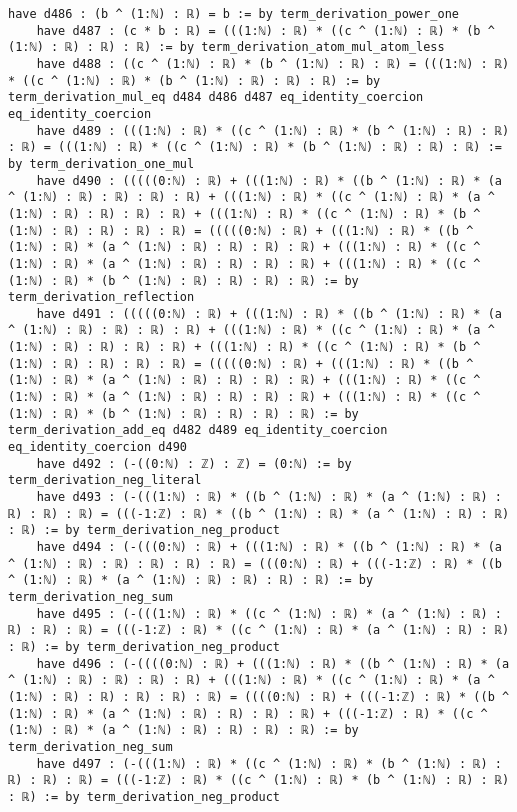\documentclass{article}
\begin{document}
\begin{tcolorbox}[colback=white!10, width=\linewidth]
\begin{lstlisting}[language=Lean4]
    have d486 : (b ^ (1:ℕ) : ℝ) = b := by term_derivation_power_one
    have d487 : (c * b : ℝ) = (((1:ℕ) : ℝ) * ((c ^ (1:ℕ) : ℝ) * (b ^ (1:ℕ) : ℝ) : ℝ) : ℝ) := by term_derivation_atom_mul_atom_less
    have d488 : ((c ^ (1:ℕ) : ℝ) * (b ^ (1:ℕ) : ℝ) : ℝ) = (((1:ℕ) : ℝ) * ((c ^ (1:ℕ) : ℝ) * (b ^ (1:ℕ) : ℝ) : ℝ) : ℝ) := by term_derivation_mul_eq d484 d486 d487 eq_identity_coercion eq_identity_coercion
    have d489 : (((1:ℕ) : ℝ) * ((c ^ (1:ℕ) : ℝ) * (b ^ (1:ℕ) : ℝ) : ℝ) : ℝ) = (((1:ℕ) : ℝ) * ((c ^ (1:ℕ) : ℝ) * (b ^ (1:ℕ) : ℝ) : ℝ) : ℝ) := by term_derivation_one_mul
    have d490 : (((((0:ℕ) : ℝ) + (((1:ℕ) : ℝ) * ((b ^ (1:ℕ) : ℝ) * (a ^ (1:ℕ) : ℝ) : ℝ) : ℝ) : ℝ) + (((1:ℕ) : ℝ) * ((c ^ (1:ℕ) : ℝ) * (a ^ (1:ℕ) : ℝ) : ℝ) : ℝ) : ℝ) + (((1:ℕ) : ℝ) * ((c ^ (1:ℕ) : ℝ) * (b ^ (1:ℕ) : ℝ) : ℝ) : ℝ) : ℝ) = (((((0:ℕ) : ℝ) + (((1:ℕ) : ℝ) * ((b ^ (1:ℕ) : ℝ) * (a ^ (1:ℕ) : ℝ) : ℝ) : ℝ) : ℝ) + (((1:ℕ) : ℝ) * ((c ^ (1:ℕ) : ℝ) * (a ^ (1:ℕ) : ℝ) : ℝ) : ℝ) : ℝ) + (((1:ℕ) : ℝ) * ((c ^ (1:ℕ) : ℝ) * (b ^ (1:ℕ) : ℝ) : ℝ) : ℝ) : ℝ) := by term_derivation_reflection
    have d491 : (((((0:ℕ) : ℝ) + (((1:ℕ) : ℝ) * ((b ^ (1:ℕ) : ℝ) * (a ^ (1:ℕ) : ℝ) : ℝ) : ℝ) : ℝ) + (((1:ℕ) : ℝ) * ((c ^ (1:ℕ) : ℝ) * (a ^ (1:ℕ) : ℝ) : ℝ) : ℝ) : ℝ) + (((1:ℕ) : ℝ) * ((c ^ (1:ℕ) : ℝ) * (b ^ (1:ℕ) : ℝ) : ℝ) : ℝ) : ℝ) = (((((0:ℕ) : ℝ) + (((1:ℕ) : ℝ) * ((b ^ (1:ℕ) : ℝ) * (a ^ (1:ℕ) : ℝ) : ℝ) : ℝ) : ℝ) + (((1:ℕ) : ℝ) * ((c ^ (1:ℕ) : ℝ) * (a ^ (1:ℕ) : ℝ) : ℝ) : ℝ) : ℝ) + (((1:ℕ) : ℝ) * ((c ^ (1:ℕ) : ℝ) * (b ^ (1:ℕ) : ℝ) : ℝ) : ℝ) : ℝ) := by term_derivation_add_eq d482 d489 eq_identity_coercion eq_identity_coercion d490
    have d492 : (-((0:ℕ) : ℤ) : ℤ) = (0:ℕ) := by term_derivation_neg_literal
    have d493 : (-(((1:ℕ) : ℝ) * ((b ^ (1:ℕ) : ℝ) * (a ^ (1:ℕ) : ℝ) : ℝ) : ℝ) : ℝ) = (((-1:ℤ) : ℝ) * ((b ^ (1:ℕ) : ℝ) * (a ^ (1:ℕ) : ℝ) : ℝ) : ℝ) := by term_derivation_neg_product
    have d494 : (-(((0:ℕ) : ℝ) + (((1:ℕ) : ℝ) * ((b ^ (1:ℕ) : ℝ) * (a ^ (1:ℕ) : ℝ) : ℝ) : ℝ) : ℝ) : ℝ) = (((0:ℕ) : ℝ) + (((-1:ℤ) : ℝ) * ((b ^ (1:ℕ) : ℝ) * (a ^ (1:ℕ) : ℝ) : ℝ) : ℝ) : ℝ) := by term_derivation_neg_sum
    have d495 : (-(((1:ℕ) : ℝ) * ((c ^ (1:ℕ) : ℝ) * (a ^ (1:ℕ) : ℝ) : ℝ) : ℝ) : ℝ) = (((-1:ℤ) : ℝ) * ((c ^ (1:ℕ) : ℝ) * (a ^ (1:ℕ) : ℝ) : ℝ) : ℝ) := by term_derivation_neg_product
    have d496 : (-((((0:ℕ) : ℝ) + (((1:ℕ) : ℝ) * ((b ^ (1:ℕ) : ℝ) * (a ^ (1:ℕ) : ℝ) : ℝ) : ℝ) : ℝ) + (((1:ℕ) : ℝ) * ((c ^ (1:ℕ) : ℝ) * (a ^ (1:ℕ) : ℝ) : ℝ) : ℝ) : ℝ) : ℝ) = ((((0:ℕ) : ℝ) + (((-1:ℤ) : ℝ) * ((b ^ (1:ℕ) : ℝ) * (a ^ (1:ℕ) : ℝ) : ℝ) : ℝ) : ℝ) + (((-1:ℤ) : ℝ) * ((c ^ (1:ℕ) : ℝ) * (a ^ (1:ℕ) : ℝ) : ℝ) : ℝ) : ℝ) := by term_derivation_neg_sum
    have d497 : (-(((1:ℕ) : ℝ) * ((c ^ (1:ℕ) : ℝ) * (b ^ (1:ℕ) : ℝ) : ℝ) : ℝ) : ℝ) = (((-1:ℤ) : ℝ) * ((c ^ (1:ℕ) : ℝ) * (b ^ (1:ℕ) : ℝ) : ℝ) : ℝ) := by term_derivation_neg_product

\end{lstlisting}
\end{tcolorbox}
\end{document}
